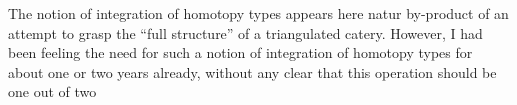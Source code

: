 The notion of integration of homotopy types appears here  natur
by-product of an attempt to grasp the ``full structure'' of a triangulated
catery. However, I had been feeling the need for such a notion of
integration of homotopy types for about one or two years already,
\hand{(}without any clear   that this operation should be one out of two

